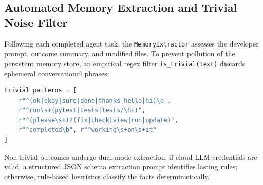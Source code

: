 \documentclass[conference]{IEEEtran}
\begin{document}
\subsection{Automated Memory Extraction and Trivial Noise Filter}
Following each completed agent task, the \texttt{MemoryExtractor} assesses the developer prompt, outcome summary, and modified files. To prevent pollution of the persistent memory store, an empirical regex filter \texttt{is\_trivial(text)} discards ephemeral conversational phrases:
\begin{lstlisting}[language=Python]
trivial_patterns = [
    r"^(ok|okay|sure|done|thanks|hello|hi)\b",
    r"^run\s+(pytest|tests|tests/\S+)",
    r"^(please\s+)?(fix|check|view|run|update)",
    r"^completed\b", r"^working\s+on\s+it"
]
\end{lstlisting}
Non-trivial outcomes undergo dual-mode extraction: if cloud LLM credentials are valid, a structured JSON schema extraction prompt identifies lasting rules; otherwise, rule-based heuristics classify the facts deterministically.

\begin{table}[!t]
\caption{Backend Modules and Technology Stack}
\label{tab:tech_stack}
\centering
{}
\end{table}
\end{document}

